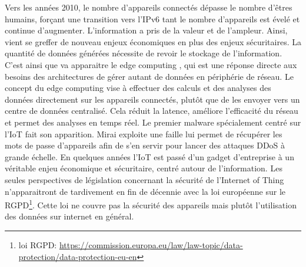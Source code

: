 Vers les années 2010, le nombre d'appareils connectés dépasse le nombre d'êtres humains, forçant une transition vers l'IPv6 tant le nombre d'appareils est évelé et continue d'augmenter. L'information a pris de la valeur et de l'ampleur. Ainsi, vient se greffer de nouveau enjeux économiques en plus des enjeux sécuritaires. La quantité de données générées nécessite de revoir le stockage de l'information. C'est ainsi que va apparaitre le edge computing \cite{edge}, qui est une réponse directe aux besoins des architectures de gérer autant de données en périphérie de réseau. Le concept du edge computing vise à effectuer des calculs et des analyses des données directement sur les appareils connectés, plutôt que de les envoyer vers un centre de données centralisé. Cela réduit la latence, améliore l'efficacité du réseau et permet des analyses en temps réel. Le premier malware spécialement centré sur l'\ac{IoT} fait son apparition. Mirai\cite{Mirai} exploite une faille lui permet de récupérer les mots de passe d'appareils afin de s'en servir pour lancer des attaques \ac{DDoS} à grande échelle. En quelques années l'\ac{IoT} est passé d'un gadget d'entreprise à un véritable enjeu économique et sécuritaire, centré autour de l'information. Les seules perspectives de législation concernant la sécurité de l'Internet of Thing n'apparaitront de tardivement en fin de décennie avec la loi européenne sur le \ac{RGPD}\footnote{loi RGPD: \href{https://commission.europa.eu/law/law-topic/data-protection/data-protection-eu_en}{{https://commission.europa.eu/law/law-topic/data-protection/data-protection-eu-en}}}. Cette loi ne couvre pas la sécurité des appareils mais plutôt l'utilisation des données sur internet en général.

\vspace{0.1cm}

